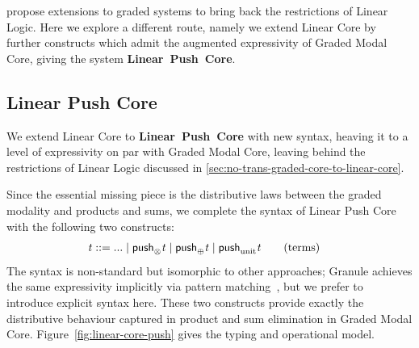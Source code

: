 \citet{hughes2021linear} propose extensions to graded systems to bring back the restrictions of
Linear Logic. Here we explore a different route, namely we extend Linear Core by further constructs
which admit the augmented expressivity of Graded Modal Core, giving the system \textbf{Linear~Push~Core}.


\subsection{Linear Push Core}
\label{sec:linear-push-core}
%
We extend Linear Core to \textbf{Linear~Push~Core} with new syntax, heaving it to a level of
expressivity on par with Graded Modal Core, leaving behind the restrictions of Linear Logic
discussed in \ref{sec:no-trans-graded-core-to-linear-core}.

Since the essential missing piece is the distributive laws between the graded modality and
products and sums, we complete the syntax of Linear Push Core with the following two constructs:
%
\begin{align*}
  \mathit{t} & ::= ... \mid  \textsf{push}_\otimes  \mathit{t}  \mid  \textsf{push}_\oplus  \mathit{t}  \mid  \textsf{push}_{\mathrm{unit} }  \mathit{t} 
  \tag{terms}
\end{align*}
%
The syntax is non-standard but isomorphic to other approaches; Granule achieves the same
expressivity implicitly via pattern matching~\cite{DBLP:journals/pacmpl/OrchardLE19}, but
we prefer to introduce explicit syntax here. These two constructs provide exactly
the distributive behaviour captured in product and sum elimination in Graded Modal Core.
Figure~\ref{fig:linear-core-push} gives the typing and operational model.

